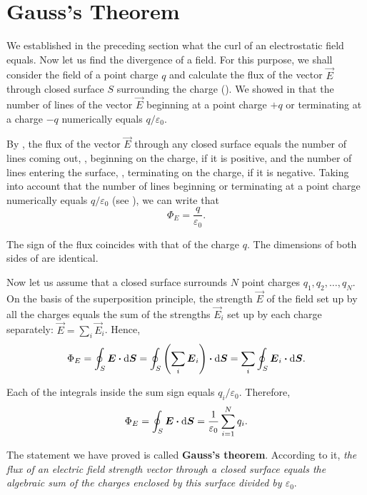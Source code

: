 \section{Gauss's Theorem}\label{sec:1_13}

We established in the preceding section what the curl of an electrostatic field equals. Now let us find the divergence of a field. For this purpose, we shall consider the field of a point charge $q$ and calculate the flux of the vector $\vec{E}$ through closed surface $S$ surrounding the charge (). We showed in  that the number of lines of the vector $\vec{E}$ beginning at a point charge $+q$ or terminating at a charge $-q$ numerically equals $q/\varepsilon_0$.

By , the flux of the vector $\vec{E}$ through any closed surface equals the number of lines coming out, \ie, beginning on the
charge, if it is positive, and the number of lines entering the surface, \ie, terminating on the charge, if it is negative. Taking into account that the number of lines beginning or terminating at a point charge numerically equals $q/\varepsilon_0$ (see ), we can write that
\begin{equation}\label{eq:1_113}
	\Phi_E = \frac{q}{\varepsilon_0}.
\end{equation}

\noindent
The sign of the flux coincides with that of the charge $q$. The dimensions of both sides of  are identical.

Now let us assume that a closed surface surrounds $N$ point charges $q_1, q_2, \ldots, q_N$. On the basis of the superposition principle, the strength $\vec{E}$ of the field set up by all the charges equals the sum of the strengths $\vec{E}_i$  set up by each charge separately: $\vec{E}=\sum_i\vec{E}_i$. Hence,
\begin{equation*}
	\Phi_E = \oint_S \boldsymbol{E}\boldsymbol{\cdot}\mathrm{d}\boldsymbol{S} = \oint_S \left(\sum_i\boldsymbol{E}_i\right)\boldsymbol{\cdot}\mathrm{d}\boldsymbol{S} = \sum_i\oint_S\boldsymbol{E}_i\boldsymbol{\cdot}\mathrm{d}\boldsymbol{S}.
\end{equation*}

\noindent
Each of the integrals inside the sum sign equals $q_i/\varepsilon_0$. Therefore,
\begin{equation}\label{eq:1_114}
	\Phi_E = \oint_S \boldsymbol{E}\boldsymbol{\cdot}\mathrm{d}\boldsymbol{S} = \frac{1}{\varepsilon_0} \sum_{i=1}^N q_i.
\end{equation}

\noindent
The statement we have proved is called \textbf{Gauss's theorem}. According to it, \textit{the flux of an electric field strength vector through a closed surface equals the algebraic sum of the charges enclosed by this surface divided by $\varepsilon_0$}.

